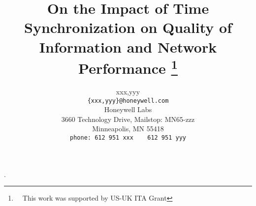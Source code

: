 \documentclass[conference]{IEEEtran}
\begin{document}
\title{On the Impact of Time Synchronization on Quality of Information and Network Performance
\thanks{~~This work was supported by US-UK ITA Grant}}
\author{{\sc xxx},{\sc yyy}\\
\normalsize{\tt \{xxx,yyy\}@honeywell.com}\\
\normalsize{Honeywell Labs} \\
\normalsize{3660 Technology Drive, Mailstop: MN65-zzz}\\
\normalsize{Minneapolis, MN 55418}\\
\normalsize{\tt phone: 612 951 xxx $\quad$ 612 951 yyy}\\
}

\maketitle
\newtheorem{theorem}{Theorem}
\newtheorem{assumption}{Assumption}
.\normalbaselineskip


%




%
%



\end{document}
